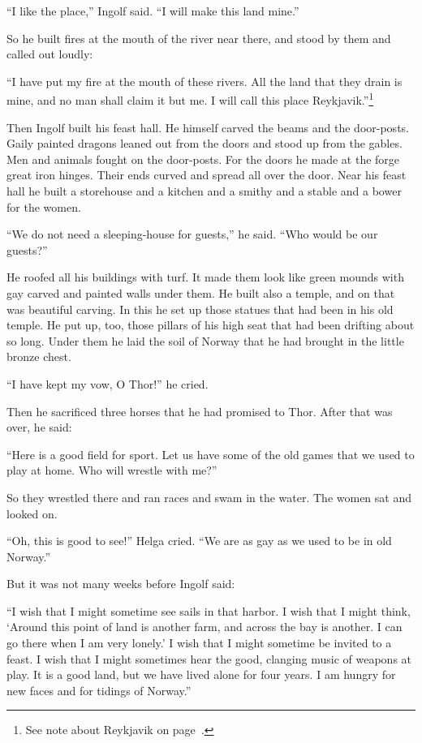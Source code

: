 ``I like the place,'' Ingolf said. ``I will make this land mine.''

So he built fires at the mouth of the river near there, and stood by
them and called out loudly:

``I have put my fire at the mouth of these rivers. All the land that
they drain is mine, and no man shall claim it but me. I will call this
place Reykjavik.''\footnote{See note about Reykjavik on
page~\pageref{reykjavik}.}

Then Ingolf built his feast hall. He himself carved the beams and the
door-posts. Gaily painted dragons leaned out from the doors and stood up
from the gables. Men and animals fought on the door-posts. For the doors
he made at the forge great iron hinges. Their ends curved and spread all
over the door. Near his feast hall he built a storehouse and a kitchen
and a smithy and a stable and a bower for the women.

``We do not need a sleeping-house for guests,'' he said. ``Who would be
our guests?''

He roofed all his buildings with turf. It made them look like green
mounds with gay carved and painted walls under them. He built also a
temple, and on that was beautiful carving. In this he set up those
statues that had been in his old temple. He put up, too, those pillars
of his high seat that had been drifting about so long. Under them he
laid the soil of Norway that he had brought in the little bronze chest.

``I have kept my vow, O Thor!'' he cried.

Then he sacrificed three horses that he had promised to Thor. After that
was over, he said:

``Here is a good field for sport. Let us have some of the old games that
we used to play at home. Who will wrestle with me?''

So they wrestled there and ran races and swam in the water. The women
sat and looked on.

``Oh, this is good to see!'' Helga cried. ``We are as gay as we used to
be in old Norway.''

But it was not many weeks before Ingolf said:

``I wish that I might sometime see sails in that harbor. I wish that I
might think, `Around this point of land is another farm, and across the
bay is another. I can go there when I am very lonely.' I wish that I
might sometime be invited to a feast. I wish that I might sometimes hear
the good, clanging music of weapons at play. It is a good land, but we
have lived alone for four years. I am hungry for new faces and for
tidings of Norway.''

